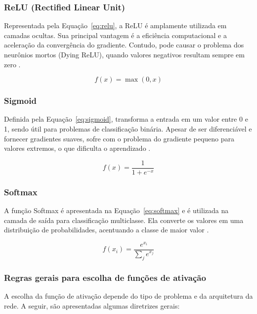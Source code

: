 \subsubsection{ReLU (Rectified Linear Unit)}
Representada pela Equação~\ref{eq:relu}, a ReLU é amplamente utilizada em camadas ocultas. Sua principal vantagem é a eficiência computacional e a aceleração da convergência do gradiente. Contudo, pode causar o problema dos neurônios mortos (Dying ReLU), quando valores negativos resultam sempre em zero \cite{agarap2018deep}.

\begin{equation}
    f(x) = \max(0, x)
    \label{eq:relu}
\end{equation}

\subsubsection{Sigmoid}

Definida pela Equação~\ref{eq:sigmoid}, transforma a entrada em um valor entre 0 e 1, sendo útil para problemas de classificação binária. Apesar de ser diferenciável e fornecer gradientes suaves, sofre com o problema do gradiente pequeno para valores extremos, o que dificulta o aprendizado \cite{langer2020approximating}.

\begin{equation}
    f(x) = \frac{1}{1 + e^{-x}}
    \label{eq:sigmoid}
\end{equation}

\subsubsection{Softmax}
A função Softmax é apresentada na Equação~\ref{eq:softmax} e é utilizada na camada de saída para classificação multiclasse. Ela converte os valores em uma distribuição de probabilidades, acentuando a classe de maior valor \cite{gao2017properties}.


\begin{equation}
    f(x_i) = \frac{e^{x_i}}{\sum_j e^{x_j}}
    \label{eq:softmax}
\end{equation}

\subsubsection{Regras gerais para escolha de funções de ativação}

A escolha da função de ativação depende do tipo de problema e da arquitetura da rede. A seguir, são apresentadas algumas diretrizes gerais:

